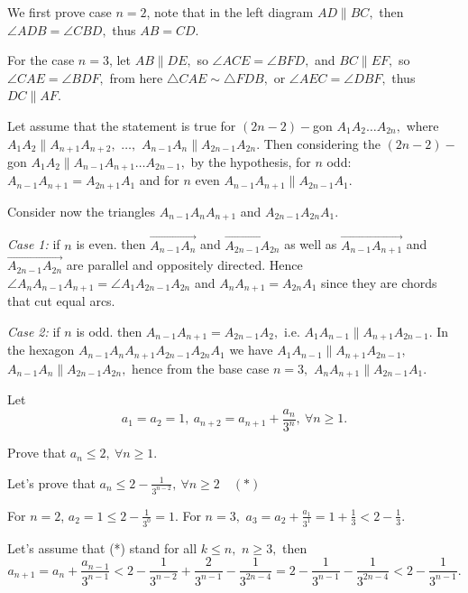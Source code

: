 \documentclass{article}
\begin{document}
\begin{soln}
    We first prove case $n=2$, note that in the left diagram $AD \parallel BC,$ then $\angle ADB = \angle CBD,$ thus $AB=CD.$

    For the case $n=3$, let $AB \parallel DE,$ so $\angle ACE = \angle BFD,$ and $ BC \parallel EF,$ so $\angle CAE = \angle BDF,$
    from here $\triangle CAE \sim \triangle FDB,$ or $\angle AEC = \angle DBF,$ thus $DC \parallel AF.$

    Let assume that the statement is true for $(2n-2)-$gon $A_1 A_2 \ldots A_{2n},$ where $A_1A_2 \parallel A_{n+1}A_{n+2},$ $\ldots,$
    $A_{n-1}A_n \parallel A_{2n-1}A_{2n}.$ Then considering the $(2n-2)-$gon $A_1A_2 \parallel A_{n-1}A_{n+1} \ldots A_{2n-1},$
    by the hypothesis, for $n$ odd: $A_{n-1}A_{n+1} = A_{2n+1}A_1$ and for $n$ even $A_{n-1}A_{n+1} \parallel A_{2n-1}A_1.$

    Consider now the triangles $A_{n-1}A_nA_{n+1}$ and $A_{2n-1}A_{2n}A_1.$
    
    \textit{Case 1:} if $n$ is even. then $\overrightarrow{A_{n-1}A_n}$ and $\overrightarrow{A_{2n-1}A_{2n}}$ as well as 
    $\overrightarrow{A_{n-1}A_{n+1}}$ and $\overrightarrow{A_{2n-1}A_{2n}}$ are parallel and oppositely directed.
    Hence $\angle A_nA_{n-1}A_{n+1} = \angle A_1 A_{2n-1} A_{2n}$ and $A_nA_{n+1} = A_{2n}A_1$ since they are chords that cut equal arcs.

    \textit{Case 2:} if $n$ is odd. then $A_{n-1}A_{n+1} = A_{2n-1}A_2,$ i.e. $A_1 A_{n-1} \parallel A_{n+1}A_{2n-1}.$ 
    In the hexagon $A_{n-1}A_n A_{n+1}A_{2n-1}A_{2n}A_{1}$ we have $A_1 A_{n-1} \parallel A_{n+1}A_{2n-1},$ $A_{n-1}A_n \parallel A_{2n-1}A_{2n},$
    hence from the base case $n=3,$ $A_nA_{n+1} \parallel A_{2n-1}A_1.$ 
\end{soln}

\begin{problem}
    Let 
    \[ 
        a_1 = a_2 = 1,\ a_{n+2} = a_{n+1} + \frac{a_n}{3^n},\ \forall n \ge 1.
    \]

    Prove that $a_n \le 2,\ \forall n \ge 1.$
\end{problem}

\begin{soln}
    Let's prove that $a_n \le 2 - \frac{1}{3^{n-2}},\ \forall n \ge 2 \quad (*)$
    
    For $n=2$, $a_2 = 1 \le 2 - \frac{1}{3^{0}} = 1.$ For $n=3,$ $a_3 = a_2 + \frac{a_1}{3^1} = 1 + \frac{1}{3} < 2 - \frac{1}{3}.$

    Let's assume that (*) stand for all $k \le n,$ $n\ge 3,$ then
    \[
        a_{n+1} = a_{n} + \frac{a_{n-1}}{3^{n-1}} < 2 - \frac{1}{3^{n-2}} + \frac{2}{3^{n-1}} - \frac{1}{3^{2n-4}}
        = 2 - \frac{1}{3^{n-1}} - \frac{1}{3^{2n-4}} < 2 - \frac{1}{3^{n-1}}.
    \]
\end{soln}
\end{document}
